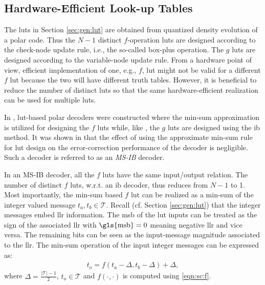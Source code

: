 \subsection{Hardware-Efficient Look-up Tables}\label{sec:lut:variants}

The  \glspl{lut} in Section \ref{sec:gen:lut} are obtained from quantized density evolution of a polar code. 
Thus the $N{-}1$ distinct $f$-operation \glspl{lut} are designed according to the check-node update rule, i.e., the so-called box-plus operation. 
The $g$ \glspl{lut} are designed according to the variable-node update rule.
From a hardware point of view, efficient implementation of one, e.g., $f$, \gls{lut} might not be valid for a different $f$ \gls{lut} because the two will have different truth tables. However, it is beneficial to reduce the number of distinct \glspl{lut} so that the same hardware-efficient realization can be used for multiple \glspl{lut}.

In \cite{shah_MSIB_2023}, \gls{lut}-based polar decoders were constructed where the min-sum approximation is utilized for designing the $f$ \glspl{lut} while, like \cite{shah_coarsely_2019}, the $g$ \glspl{lut} are designed using the \gls{ib} method. It was shown in \cite{shah_MSIB_2023} that the effect of using the approximate min-sum rule for \gls{lut} design on the error-correction performance of the decoder is negligible. Such a decoder is referred to as an \emph{MS-IB} decoder.  

In an MS-IB decoder, all the $f$ \glspl{lut} have the same input/output relation. The number of distinct  $f$ \glspl{lut}, w.r.t. an \gls{ib} decoder, thus reduces from $N-1$ to 1. Most importantly, the min-sum based $f$ \gls{lut} can be realized as a min-sum of the integer valued message $t_a,t_b \in \mathcal{T}$. 
Recall (cf. Section \ref{sec:gen:lut}) that the integer messages embed \gls{llr} information. The \gls{msb} of the \gls{lut} inputs can be treated as the sign of the associated \gls{llr} with $\text{\gls{msb}}=0$ meaning negative \gls{llr} and vice versa. The remaining bits can be seen as the input-message magnitude associated to the \gls{llr}. The min-sum operation of the input integer messages can be expressed as:
\begin{align}\label{eqn:lut:minsum}
    t_o = f( t_a - \Delta, t_b - \Delta) + \Delta, 
\end{align}
where $\Delta= \frac{|\mathcal{T}|-1}{2}$, $t_o \in \mathcal{T}$ and $f(\cdot,\cdot)$ is computed using \eqref{eqn:sc:f}.


